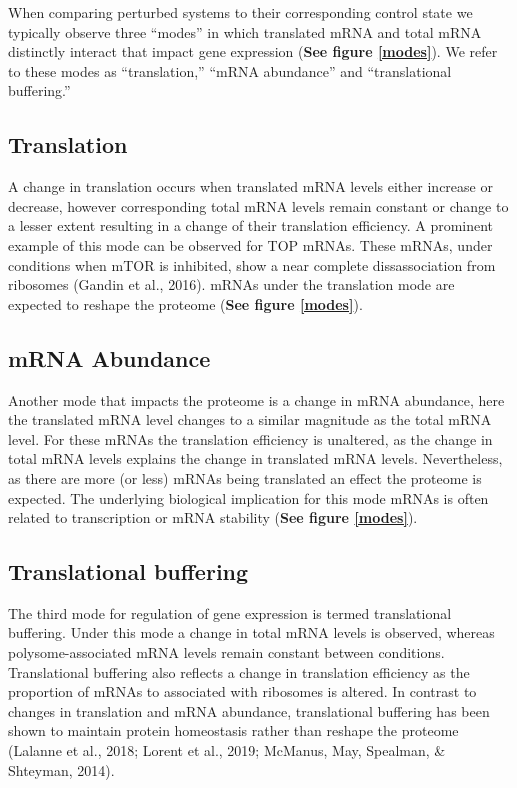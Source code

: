 \documentclass[
  12pt,
  openany]{book}
\begin{document}
When comparing perturbed systems to their corresponding control state we typically observe three ``modes'' in which translated mRNA and total mRNA distinctly interact that impact gene expression (\textbf{See figure \ref{modes}}). We refer to these modes as ``translation,'' ``mRNA abundance'' and ``translational buffering.''

\subsection{Translation}

A change in translation occurs when translated mRNA levels either increase or decrease, however corresponding total mRNA levels remain constant or change to a lesser extent resulting in a change of their translation efficiency. A prominent example of this mode can be observed for TOP mRNAs. These mRNAs, under conditions when mTOR is inhibited, show a near complete dissassociation from ribosomes (Gandin et al., 2016). mRNAs under the translation mode are expected to reshape the proteome (\textbf{See figure \ref{modes}}).

\subsection{mRNA Abundance}

Another mode that impacts the proteome is a change in mRNA abundance, here the translated mRNA level changes to a similar magnitude as the total mRNA level. For these mRNAs the translation efficiency is unaltered, as the change in total mRNA levels explains the change in translated mRNA levels. Nevertheless, as there are more (or less) mRNAs being translated an effect the proteome is expected. The underlying biological implication for this mode mRNAs is often related to transcription or mRNA stability (\textbf{See figure \ref{modes}}).

\subsection{Translational buffering} \label{modeBuffering}

The third mode for regulation of gene expression is termed translational buffering. Under this mode a change in total mRNA levels is observed, whereas polysome-associated mRNA levels remain constant between conditions. Translational buffering also reflects a change in translation efficiency as the proportion of mRNAs to associated with ribosomes is altered. In contrast to changes in translation and mRNA abundance, translational buffering has been shown to maintain protein homeostasis rather than reshape the proteome (Lalanne et al., 2018; Lorent et al., 2019; McManus, May, Spealman, \& Shteyman, 2014).
\end{document}
